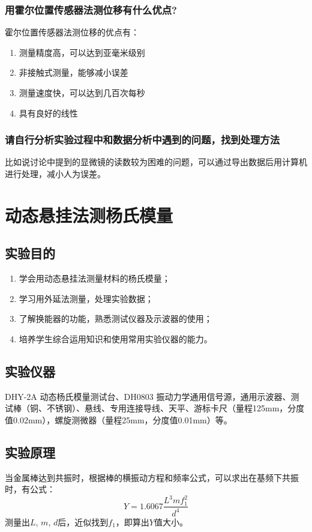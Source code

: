 \documentclass[zihao=5, UTF8]{article}
\theoremstyle{MyLineTheoremStyle} %
\theoremstyle{MyBlockTheoremStyle} %
\theoremstyle{MySubsubsectionStyle} %
\begin{document}
\subsubsection{用霍尔位置传感器法测位移有什么优点?}
霍尔位置传感器法测位移的优点有：
\begin{enumerate}
    \item 测量精度高，可以达到亚毫米级别
    \item 非接触式测量，能够减小误差
    \item 测量速度快，可以达到几百次每秒
    \item 具有良好的线性
\end{enumerate}
\subsubsection{请自行分析实验过程中和数据分析中遇到的问题，找到处理方法}
比如说讨论中提到的显微镜的读数较为困难的问题，可以通过导出数据后用计算机进行处理，减小人为误差。

\section{动态悬挂法测杨氏模量}

\subsection{实验目的}
\begin{enumerate}
    \item 学会用动态悬挂法测量材料的杨氏模量；
    \item 学习用外延法测量，处理实验数据；
    \item 了解换能器的功能，熟悉测试仪器及示波器的使用；
    \item 培养学生综合运用知识和使用常用实验仪器的能力。
\end{enumerate}

\subsection{实验仪器}
DHY-2A 动态杨氏模量测试台、DH0803 振动力学通用信号源，通用示波器、测试棒（铜、不锈钢）、悬线、专用连接导线、天平、游标卡尺（量程125mm，分度值0.02mm），螺旋测微器（量程25mm，分度值0.01mm）等。

\subsection{实验原理}
当金属棒达到共振时，根据棒的横振动方程和频率公式，可以求出在基频下共振时，有公式：
\[ Y = 1.6067 \frac{L^3 m f_1^2}{d^4} \]
测量出$L$, $m$, $d$后，近似找到$f_1$，即算出$Y$值大小。
\end{document}
